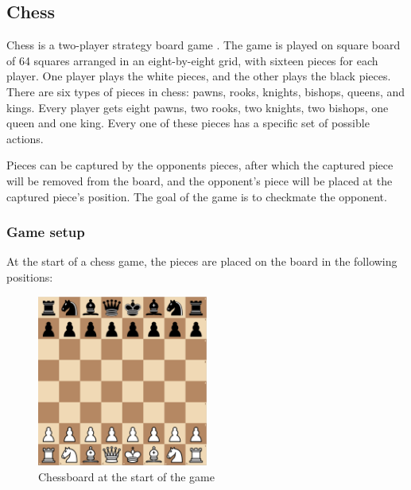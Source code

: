 \documentclass{article}
\begin{document}
% 
%
%

\subsection{Chess}

Chess is a two-player strategy board game \cite{Chess2022a}. The game is played on square board of 64 squares arranged in an eight-by-eight grid, 
with sixteen pieces for each player. One player plays the white pieces, and the other plays the black pieces.
There are six types of pieces in chess: pawns, rooks, knights, bishops, queens, and kings. Every player gets eight pawns,
two rooks, two knights, two bishops, one queen and one king. Every one of these pieces has a specific set of possible actions. 

Pieces can be captured by the opponents pieces, after which the captured piece will be removed from the board, and the opponent's piece
will be placed at the captured piece's position. The goal of the game is to checkmate the opponent.

\subsubsection{Game setup}

At the start of a chess game, the pieces are placed on the board in the following positions:

\begin{figure}[H]
    \centering
    \includegraphics[width=0.5\textwidth]{img/chess-initial.png}
    \caption{Chessboard at the start of the game \cite{ChessBoardEditor}}
\end{figure}
\end{document}

